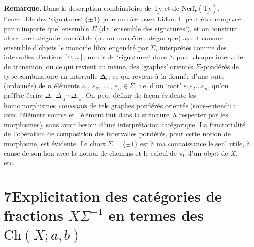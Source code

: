 \documentclass[11pt]{article}
\newcommand{\printedpage}[1]{\marginpar{\footnotesize p.~#1}}
\newcommand{\msp}[1]{\marginpar{\vspace*{10pt}\footnotesize [#1]}}
\newcommand{\Ch}{\underline{\mathrm{Ch}}}
\newcommand{\Ty}{\underline{\mathrm{Ty}}}
\newcommand{\Nerf}{\mathrm{Nerf}}
\begin{document}
\textbf{Remarque.} Dans la description combinatoire de $\Ty$ et de $\Nerf_\bullet(\Ty)$, l'ensemble des `signatures' $\{\pm1\}$ joue un rôle assez bidon. Il peut être remplacé par n'importe quel ensemble $\Sigma$ (dit `ensemble des signatures'), et on construit alors une catégorie monoïdale (ou un monoïde catégorique) ayant comme ensemble d'objets le monoïde libre engendré par $\Sigma$, interprétés comme des intervalles d'entiers $[0,n]$, munis de `signatures' dans $\Sigma$ pour chaque intervalle de transition, ou ce qui revient au même, des `graphes' orientés $\Sigma$-pondérés de type combinatoire un intervalle $\boldsymbol{\Delta}_i$, ce qui revient à la donnée d'une suite (ordonnée) de $n$ éléments $\varepsilon_1,\ \varepsilon_2,\ \ldots\ ,\ \varepsilon_n \in \Sigma$, i.e. d'un `mot' $\varepsilon_1\varepsilon_2\ldots\varepsilon_n$, qu'on préfère écrire $\Delta_{\varepsilon_1}\Delta_{\varepsilon_2}\cdots\Delta_{\varepsilon_n}$. On peut définir de façon évidente les homomorphismes \textit{croissants} de tels graphes pondérés orientés (sous-entendu : avec l'élément source et l'élément but dans la structure, à respecter par les morphismes), sans avoir besoin d'une interprétation catégorique. La fonctorialité de l'opération de composition des intervalles pondérés, pour cette notion de morphisme, est évidente. Le
\msp{page 59}
choix $\Sigma = \{\pm1\}$ est à ma connaissance le seul utile, à cause de son lien avec la notion de chemins et le calcul de $\pi_0$ d'un objet de $X$, etc.

\printedpage{40}
\section*{7\quad Explicitation des catégories de fractions $X\Sigma^{-1}$ en termes des $\Ch(X;a,b)$}
\end{document}
